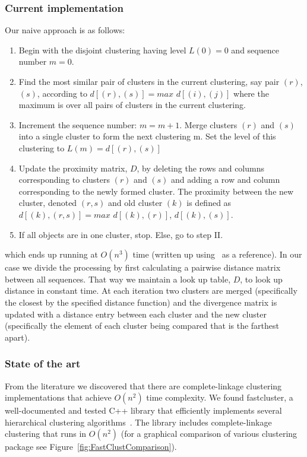 \subsubsection*{Current implementation}
Our naive approach is as follows:
\begin{enumerate}[I]
\item Begin with the disjoint clustering having level $L(0) = 0$ and sequence number $m = 0$.
\item Find the most similar pair of clusters in the current clustering, say pair $(r)$, $(s)$, according to $d[(r),(s)] = max$ $d[(i),(j)]$ where the maximum is over all pairs of clusters in the current clustering.
\item Increment the sequence number: $m = m + 1$. Merge clusters $(r)$ and $(s)$ into a single cluster to form the next clustering m. Set the level of this clustering to $L(m) = d[(r),(s)]$
\item Update the proximity matrix, $D$, by deleting the rows and columns corresponding to clusters $(r)$ and $(s)$ and adding a row and column corresponding to the newly formed cluster. The proximity between the new cluster, denoted $(r,s)$ and old cluster $(k)$ is defined as $d[(k), (r,s)] = max$ $d[(k),(r)]$, $d[(k),(s)]$.
\item If all objects are in one cluster, stop. Else, go to step II.
\end{enumerate}
which ends up running at $O(n^3)$ time (written up using~\cite{FastClust} as a reference).
In our case we divide the processing by first calculating a pairwise distance matrix between all sequences.
That way we maintain a look up table, $D$, to look up distance in constant time.
At each iteration two clusters are merged (specifically the closest by the specified distance function) and the divergence matrix is updated with a distance entry between each cluster and the new cluster (specifically the element of each cluster being compared that is the farthest apart).

\subsubsection*{State of the art}
From the literature we discovered that there are complete-linkage clustering implementations that achieve $O(n^2)$ time complexity.
We found fastcluster, a well-documented and tested C++ library that efficiently implements several hierarchical clustering algorithms~\cite{mullner2011modern, FastClust}.
The library includes complete-linkage clustering that runs in $O(n^2)$ (for a graphical comparison of various clustering package see Figure~\ref{fig:FastClustComparison}).

